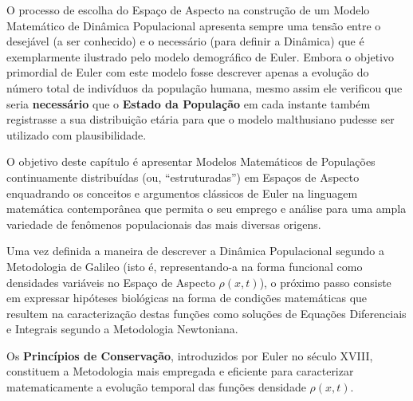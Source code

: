 O processo de escolha do Espaço de Aspecto na construção de um Modelo Matemático de Dinâmica Populacional apresenta sempre uma tensão entre o desejável (a ser conhecido) e o necessário (para definir a Dinâmica) que é exemplarmente ilustrado pelo modelo demográfico de Euler. Embora o objetivo primordial de Euler com este modelo fosse descrever apenas a evolução do número total de indivíduos da população humana, mesmo assim ele verificou que seria \textbf{necessário} que o \textbf{Estado da População} em cada instante também registrasse a sua distribuição etária para que o modelo malthusiano pudesse ser utilizado com plausibilidade.

O objetivo deste capítulo é apresentar Modelos Matemáticos de Populações continuamente distribuídas (ou, ``estruturadas'') em Espaços de Aspecto enquadrando os conceitos e argumentos clássicos de Euler na linguagem matemática contemporânea que permita o seu emprego e análise para uma ampla variedade de fenômenos populacionais das mais diversas origens.

Uma vez definida a maneira de descrever a Dinâmica Populacional segundo a Metodologia de Galileo (isto é, representando-a na forma funcional como densidades variáveis no Espaço de Aspecto \(\rho(x, t)\)), o próximo passo consiste em expressar hipóteses biológicas na forma de condições matemáticas que resultem na caracterização destas funções como soluções de Equações Diferenciais e Integrais segundo a Metodologia Newtoniana.

Os \textbf{Princípios de Conservação}, introduzidos por Euler no século XVIII, constituem a Metodologia mais empregada e eficiente para caracterizar matematicamente a evolução temporal das funções densidade \(\rho(x, t)\).

